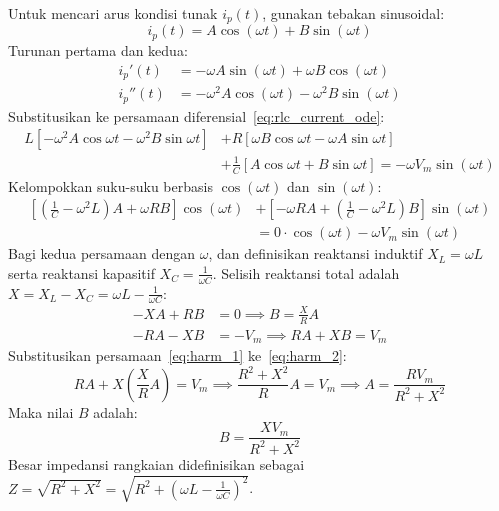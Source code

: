 \documentclass[11pt,a4paper]{article}
\theoremstyle{definition}
\begin{document}
Untuk mencari arus kondisi tunak $i_p(t)$, gunakan tebakan sinusoidal:
\begin{equation}
    i_p(t) = A \cos(\omega t) + B \sin(\omega t)
    \label{eq:ip_guess}
\end{equation}
Turunan pertama dan kedua:
\begin{align}
    i_p'(t) &= -\omega A \sin(\omega t) + \omega B \cos(\omega t) \\
    i_p''(t) &= -\omega^2 A \cos(\omega t) - \omega^2 B \sin(\omega t)
\end{align}
Substitusikan ke persamaan diferensial~\eqref{eq:rlc_current_ode}:
\begin{align*}
    L \left[ -\omega^2 A \cos\omega t - \omega^2 B \sin\omega t \right] &+ R \left[ \omega B \cos\omega t - \omega A \sin\omega t \right] \\
    &+ \frac{1}{C} \left[ A \cos\omega t + B \sin\omega t \right] = -\omega V_m \sin(\omega t)
\end{align*}
Kelompokkan suku-suku berbasis $\cos(\omega t)$ dan $\sin(\omega t)$:
\begin{align}
    \left[ \left(\frac{1}{C} - \omega^2 L\right) A + \omega R B \right] \cos(\omega t) &+ \left[ -\omega R A + \left(\frac{1}{C} - \omega^2 L\right) B \right] \sin(\omega t) \nonumber \\
    &= 0 \cdot \cos(\omega t) - \omega V_m \sin(\omega t)
    \label{eq:harmonic_balance}
\end{align}
Bagi kedua persamaan dengan $\omega$, dan definisikan reaktansi induktif $X_L = \omega L$ serta reaktansi kapasitif $X_C = \frac{1}{\omega C}$. Selisih reaktansi total adalah $X = X_L - X_C = \omega L - \frac{1}{\omega C}$:
\begin{align}
    -X A + R B &= 0 \implies B = \frac{X}{R} A \label{eq:harm_1} \\
    -R A - X B &= -V_m \implies R A + X B = V_m \label{eq:harm_2}
\end{align}
Substitusikan persamaan~\eqref{eq:harm_1} ke~\eqref{eq:harm_2}:
\begin{equation}
    R A + X \left( \frac{X}{R} A \right) = V_m \implies \frac{R^2 + X^2}{R} A = V_m \implies A = \frac{R V_m}{R^2 + X^2}
\end{equation}
Maka nilai $B$ adalah:
\begin{equation}
    B = \frac{X V_m}{R^2 + X^2}
\end{equation}
Besar impedansi rangkaian didefinisikan sebagai $Z = \sqrt{R^2 + X^2} = \sqrt{R^2 + \left(\omega L - \frac{1}{\omega C}\right)^2}$.
\end{document}
